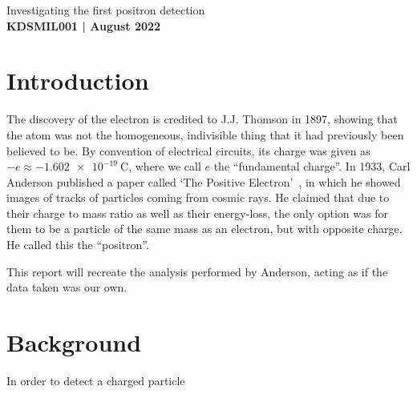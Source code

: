 \documentclass[11pt]{article}
\numberwithin{equation}{section}
\numberwithin{figure}{section}
\numberwithin{table}{section}
\begin{document}
\begin{center}
    {\huge Investigating the first positron detection}\\
    \vspace{0.2in}
    \textbf{KDSMIL001 | August 2022}
    
\end{center}

\section{Introduction}\label{sec:Introduction}
The discovery of the electron is credited to J.J. Thomson in 1897, showing that the atom was not the homogeneous, indivisible thing that it had previously been believed to be. By convention of electrical circuits, its charge was given as $-e\approx-\SI{1.602e-19}{\coulomb}$, where we call $e$ the ``fundamental charge''. In 1933, Carl Anderson published a paper called `The Positive Electron'~\cite{Pos_Electron}, in which he showed images of tracks of particles coming from cosmic rays. He claimed that due to their charge to mass ratio as well as their energy-loss, the only option was for them to be a particle of the same mass as an electron, but with opposite charge. He called this the ``positron''. 

This report will recreate the analysis performed by Anderson, acting as if the data taken was our own.

\section{Background}\label{sec:Background}
In order to detect a charged particle
\end{document}
